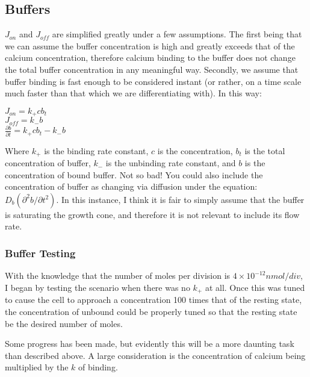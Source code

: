 \documentclass[12pt]{amsart}
\begin{document}
\subsection{Buffers} $J_{on}$ and $J_{off}$ are simplified greatly under a few assumptions. The first being that we can assume the buffer concentration is high and greatly exceeds that of the calcium concentration, therefore calcium binding to the buffer does not change the total buffer concentration in any meaningful way. Secondly, we assume that buffer binding is fast enough to be considered instant (or rather, on a time scale much faster than that which we are differentiating with). In this way:

\begin{center}

    $J_{on} = k_+cb_t$\\
    $J_{off} = k_-b$\\
    $\frac{\partial b}{\partial t} =  k_+cb_t - k_-b$
    
\end{center}
\bigskip

Where $k_+$ is the binding rate constant, $c$ is the concentration, $b_t$ is the total concentration of buffer, $k_-$ is the unbinding rate constant, and $b$ is the concentration of bound buffer. Not so bad! You could also include the concentration of buffer as changing via diffusion under the  equation: $D_b(\partial^2 b / \partial t^2)$. In this instance, I think it is fair to simply assume that the buffer is saturating the growth cone, and therefore it is not relevant to include its flow rate.\newline

\subsubsection{Buffer Testing} With the knowledge that the number of moles per division is $4\times10^{-12} nmol/div
$, I began by testing the scenario when there was no $k_+$ at all. Once this was tuned to cause the cell to approach a concentration 100 times that of the resting state, the concentration of unbound could be properly tuned so that the resting state be the desired number of moles.\newline

Some progress has been made, but evidently this will be a more daunting task than described above. A large consideration is the concentration of calcium being multiplied by the $k$ of binding.\newline
\end{document}
